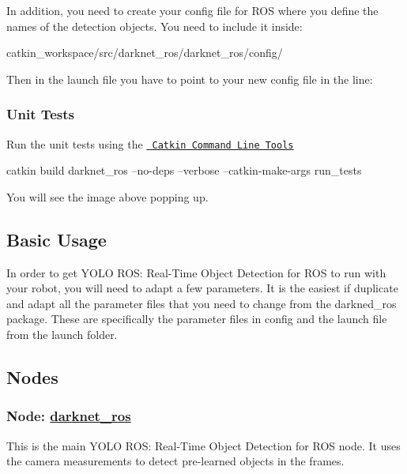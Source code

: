 In addition, you need to create your config file for R\+OS where you define the names of the detection objects. You need to include it inside\+: \begin{DoxyVerb}catkin_workspace/src/darknet_ros/darknet_ros/config/
\end{DoxyVerb}


Then in the launch file you have to point to your new config file in the line\+: 


\subsubsection*{Unit Tests}

Run the unit tests using the \href{http://catkin-tools.readthedocs.io/en/latest/index.html\#}{\texttt{ Catkin Command Line Tools}} \begin{DoxyVerb}catkin build darknet_ros --no-deps --verbose --catkin-make-args run_tests
\end{DoxyVerb}


You will see the image above popping up.

\subsection*{Basic Usage}

In order to get Y\+O\+LO R\+OS\+: Real-\/\+Time Object Detection for R\+OS to run with your robot, you will need to adapt a few parameters. It is the easiest if duplicate and adapt all the parameter files that you need to change from the {\ttfamily darkned\+\_\+ros} package. These are specifically the parameter files in {\ttfamily config} and the launch file from the {\ttfamily launch} folder.

\subsection*{Nodes}

\subsubsection*{Node\+: \mbox{\hyperlink{namespacedarknet__ros}{darknet\+\_\+ros}}}

This is the main Y\+O\+LO R\+OS\+: Real-\/\+Time Object Detection for R\+OS node. It uses the camera measurements to detect pre-\/learned objects in the frames.

